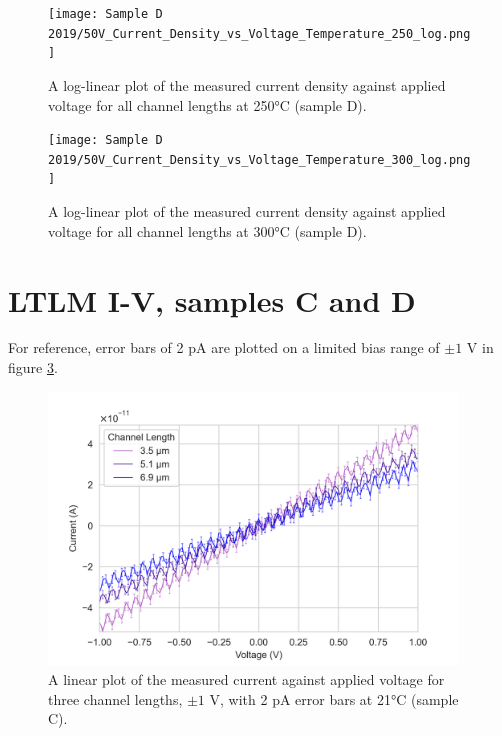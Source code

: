 \begin{figure}[h]
    \centering
    \texttt{[image: Sample D 2019/50V\_Current\_Density\_vs\_Voltage\_Temperature\_250\_log.png]}
    \caption{A log-linear plot of the measured current density against applied voltage for all channel lengths at 250\si{\degreeCelsius} (sample D).}
    \label{appfig:D_current_density_250}
\end{figure}
\begin{figure}[h]
    \centering
    \texttt{[image: Sample D 2019/50V\_Current\_Density\_vs\_Voltage\_Temperature\_300\_log.png]}
    \caption{A log-linear plot of the measured current density against applied voltage for all channel lengths at 300\si{\degreeCelsius} (sample D).}
    \label{appfig:D_current_density_300}
\end{figure}

\section{LTLM I-V, samples C and D}
\label{app:LTLM_I_V_data}

For reference, error bars of 2 \si{\pico\ampere} are plotted on a limited bias range of $\pm1$ \si{\volt} in figure \ref{appfig:1V_C_current_voltage_21}.

\begin{figure}[h]
    \centering
    \includegraphics[width=0.97\textwidth]{Appendix1/1V IV characteristics at 21 C.png}
    \caption{A linear plot of the measured current against applied voltage for three channel lengths, $\pm1$ \si{\volt}, with 2 \si{\pico\ampere} error bars at 21\si{\degreeCelsius} (sample C).}
    \label{appfig:1V_C_current_voltage_21}
\end{figure}


